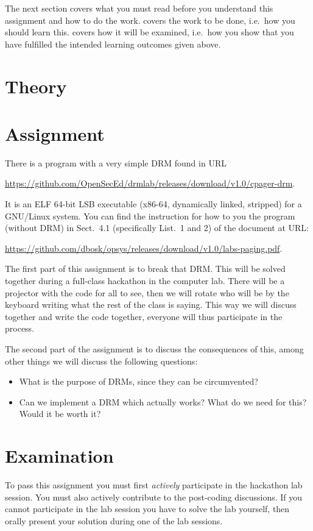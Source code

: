 The next section covers what you must read before you understand this 
assignment and how to do the work.
 covers the work to be done, i.e.~how you should learn this.
 covers how it will be examined, i.e.~how you show that you have 
fulfilled the intended learning outcomes given above.


\section{Theory}
\label{sec:reading}



\section{Assignment}
\label{sec:tasks}
There is a program with a very simple \ac{DRM} found in URL
\begin{center}
  \url{https://github.com/OpenSecEd/drmlab/releases/download/v1.0/cpager-drm}.
\end{center}
It is an ELF 64-bit LSB executable (x86-64, dynamically linked, stripped) for 
a GNU/Linux system.
You can find the instruction for how to you the program (without \ac{DRM}) in 
Sect.~4.1 (specifically List.~1 and 2) of the document at URL\@:
\begin{center}
  \url{https://github.com/dbosk/opsys/releases/download/v1.0/labs-paging.pdf}.
\end{center}
The first part of this assignment is to break that \ac{DRM}.
This will be solved together during a full-class hackathon in the computer lab.
There will be a projector with the code for all to see, then we will rotate who 
will be by the keyboard writing what the rest of the class is saying.
This way we will discuss together and write the code together, everyone will 
thus participate in the process.

The second part of the assignment is to discuss the consequences of this, among 
other things we will discuss the following questions:
\begin{itemize}
  \item What is the purpose of \acp{DRM}, since they can be circumvented?
  \item Can we implement a \ac{DRM} which actually works?
    What do we need for this?
    Would it be worth it?
\end{itemize}


\section{Examination}
\label{sec:exam}
To pass this assignment you must first \emph{actively} participate in the 
hackathon lab session.
You must also actively contribute to the post-coding discussions.
If you cannot participate in the lab session you have to solve the lab 
yourself, then orally present your solution during one of the lab sessions.


